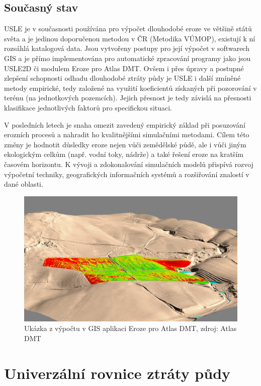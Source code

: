 \subsection{Současný stav}
USLE je v současnosti používána pro výpočet dlouhodobé eroze ve většině států světa a je jedinou doporučenou metodou v ČR (Metodika VÚMOP\cite{janecek2012}), existují k ní rozsáhlá katalogová data. Jsou vytvořeny postupy pro její výpočet v softwarech GIS a je přímo implementována pro automatické zpracování programy jako jsou USLE2D či modulem Eroze pro Atlas DMT. Ovšem i přes úpravy a postupné zlepšení schopnosti odhadu dlouhodobé ztráty půdy je USLE i další zmíněné metody empirické, tedy založené na využití koeficientů získaných při pozorování v terénu (na jednotkových pozemcích). Jejich přesnost je tedy závislá na přesnosti klasifikace jednotlivých faktorů pro specifickou situaci. 

V posledních letech je snaha omezit zavedený empirický základ při posuzování erozních procesů a nahradit ho kvalitnějšími simulačními metodami. Cílem této změny je hodnotit důsledky eroze nejen vůči zemědělské půdě, ale i vůči jiným ekologickým celkům (např. vodní toky, nádrže) a také řešení eroze na kratším časovém horizontu.  K vývoji a zdokonalování simulačních modelů přispívá rozvoj výpočetní techniky, geografických informačních systémů a rozšiřování znalostí v dané oblasti.\cite{janecek2012}
\begin{figure}[H]
    \centering
      \includegraphics[scale=0.25]{./pictures/atlas_eroze.jpg}
      \caption[Ukázka z výpočtu v GIS aplikaci Eroze pro Atlas DMT]{Ukázka z výpočtu v GIS aplikaci Eroze pro Atlas DMT, zdroj: Atlas DMT\cite{atlas_e}}
      \label{fig:atlas_eroze}
\end{figure}

\section{Univerzální rovnice ztráty půdy}
